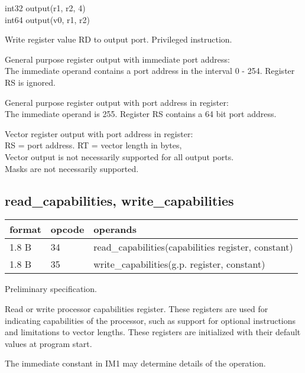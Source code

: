 \documentclass[forwardcom.tex]{subfiles}
\begin{document}
int32 output(r1, r2, 4)\\
int64 output(v0, r1, r2)
\vv

Write register value RD to output port. Privileged instruction.
\vv

General purpose register output with immediate port address:\\
The immediate operand contains a port address in the interval 0 - 254. Register RS is ignored.
\vv

General purpose register output with port address in register:\\
The immediate operand is 255. Register RS contains a 64 bit port address.
\vv

Vector register output with port address in register:\\
RS = port address. RT = vector length in bytes, \\
Vector output is not necessarily supported for all output ports.\\
Masks are not necessarily supported. 
\vv


\subsection{read\_capabilities, write\_capabilities}
\label{table:readCapabilitiesInstruction}
\begin{tabular}{|p{12mm}|p{15mm}|p{100mm}|}
\hline
\bfseries format & \bfseries opcode & \bfseries operands \\ \hline
1.8 B & 34 & read\_capabilities(capabilities register, constant) \\ \hline
1.8 B & 35 & write\_capabilities(g.p. register, constant) \\ \hline
\end{tabular}
\vv

Preliminary specification.
\vv

Read or write processor capabilities register. These registers are used for indicating capabilities of the processor, such as support for optional instructions and limitations to vector lengths. These registers are initialized with their default values at program start.
\vv

The immediate constant in IM1 may determine details of the operation.
\vv
\end{document}
